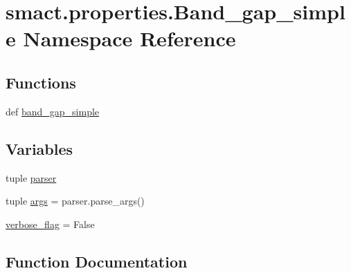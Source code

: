 \hypertarget{namespacesmact_1_1properties_1_1_band__gap__simple}{}\section{smact.\+properties.\+Band\+\_\+gap\+\_\+simple Namespace Reference}
\label{namespacesmact_1_1properties_1_1_band__gap__simple}
\subsection*{Functions}
\begin{DoxyCompactItemize}
\item 
def \hyperlink{namespacesmact_1_1properties_1_1_band__gap__simple_a5728157c4b36fde7364fa3bbf29fc114}{band\+\_\+gap\+\_\+simple}
\end{DoxyCompactItemize}
\subsection*{Variables}
\begin{DoxyCompactItemize}
\item 
tuple \hyperlink{namespacesmact_1_1properties_1_1_band__gap__simple_abe4d22f74e3d7975f257f0189add69b8}{parser}
\item 
tuple \hyperlink{namespacesmact_1_1properties_1_1_band__gap__simple_af498c67d7752b84a45f01872c6ba2430}{args} = parser.\+parse\+\_\+args()
\item 
\hyperlink{namespacesmact_1_1properties_1_1_band__gap__simple_a25cb7d2a569d44a7a849af519c43e115}{verbose\+\_\+flag} = False
\end{DoxyCompactItemize}


\subsection{Function Documentation}
\hypertarget{namespacesmact_1_1properties_1_1_band__gap__simple_a5728157c4b36fde7364fa3bbf29fc114}{}
